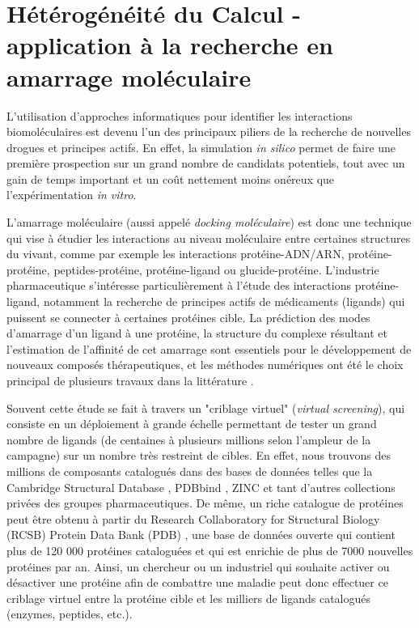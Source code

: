 \section{Hétérogénéité du Calcul - application à la recherche en amarrage moléculaire} \label{sec:Vasseur}

L'utilisation d'approches informatiques pour identifier les interactions biomoléculaires est devenu l'un des principaux piliers de la recherche de nouvelles drogues et principes actifs. En effet, la simulation \emph{in silico} permet de faire une première prospection sur un grand nombre de candidats potentiels, tout avec un gain de temps important et un coût nettement moins onéreux que l'expérimentation \emph{in vitro}. 

L'amarrage moléculaire (aussi appelé \emph{docking moléculaire}) est donc une technique qui vise à étudier les interactions au niveau moléculaire entre certaines structures du vivant, comme par exemple les interactions protéine-ADN/ARN, protéine-protéine, peptides-protéine, protéine-ligand ou glucide-protéine. L'industrie pharmaceutique s'intéresse particulièrement à l'étude des interactions protéine-ligand, notamment la recherche de principes actifs de médicaments (ligands) qui puissent se connecter à certaines protéines cible. La prédiction des modes d'amarrage d'un ligand à une protéine, la structure du complexe résultant et l'estimation de l'affinité de cet amarrage sont essentiels pour le développement de nouveaux composés thérapeutiques, et les méthodes numériques ont été le choix principal de plusieurs travaux dans la littérature \cite{Abagyan2001,Giganti2010, Klebe2006}.

 Souvent cette étude se fait à travers un "criblage virtuel" (\emph{virtual screening}), qui consiste en un déploiement à grande échelle permettant de tester un grand nombre de ligands (de centaines à plusieurs millions selon l'ampleur de la campagne) sur un nombre très restreint de cibles. En effet, nous trouvons des millions de composants catalogués dans des bases de données telles que la Cambridge Structural Database \cite{Allen2002}, PDBbind  \cite{Wang2004, Wang2005}, ZINC \cite{Irwin2005} et tant d'autres collections privées des groupes pharmaceutiques. De même, un riche catalogue de protéines peut être obtenu à partir du Research Collaboratory for Structural Biology (RCSB) Protein Data Bank (PDB) \cite{PDB}, une base de données ouverte qui contient plus de 120 000 protéines cataloguées et qui est enrichie de plus de 7000 nouvelles protéines par an. Ainsi, un chercheur ou un industriel qui souhaite activer ou désactiver une protéine afin de combattre une maladie peut donc effectuer ce criblage virtuel entre la protéine cible et les milliers de ligands catalogués (enzymes, peptides, etc.).  

